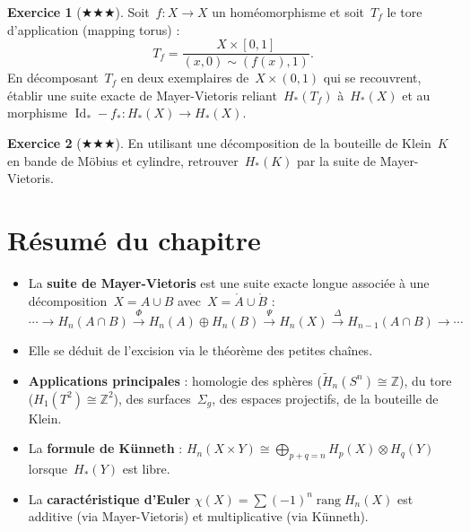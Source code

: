 \documentclass[12pt,a4paper,openany]{book}
\theoremstyle{definition}
\newtheorem{exercice}{Exercice}[chapter]
\theoremstyle{plain}
\theoremstyle{remark}
\newcommand{\Z}{\mathbb{Z}}
\DeclareMathOperator{\Id}{Id}
\begin{document}
\begin{exercice}[$\bigstar\bigstar\bigstar$]\label{exo:mv-mapping-torus}
Soit~$f \colon X \to X$ un homéomorphisme et soit~$T_f$ le tore d'application
(mapping torus) :
\[
  T_f = \frac{X \times [0,1]}{(x, 0) \sim (f(x), 1)}.
\]
En décomposant~$T_f$ en deux exemplaires de~$X \times (0,1)$ qui se recouvrent, établir
une suite exacte de Mayer-Vietoris reliant~$H_*(T_f)$ à~$H_*(X)$ et au morphisme
$\Id_* - f_* \colon H_*(X) \to H_*(X)$.
\end{exercice}

\begin{exercice}[$\bigstar\bigstar\bigstar$]\label{exo:mv-klein-mv}
En utilisant une décomposition de la bouteille de Klein~$K$ en bande de Möbius et
cylindre, retrouver~$H_*(K)$ par la suite de Mayer-Vietoris.
\end{exercice}

\section*{Résumé du chapitre}

\begin{itemize}
  \item La \textbf{suite de Mayer-Vietoris} est une suite exacte longue associée à une
    décomposition~$X = A \cup B$ avec~$X = \mathring{A} \cup \mathring{B}$ :
    \[
      \cdots \to H_n(A \cap B) \xrightarrow{\Phi} H_n(A) \oplus H_n(B) \xrightarrow{\Psi}
      H_n(X) \xrightarrow{\Delta} H_{n-1}(A \cap B) \to \cdots
    \]
  \item Elle se déduit de l'excision via le théorème des petites chaînes.
  \item \textbf{Applications principales} : homologie des sphères ($\widetilde{H}_n(S^n) \cong \Z$),
    du tore ($H_1(T^2) \cong \Z^2$), des surfaces~$\Sigma_g$, des espaces projectifs, de la
    bouteille de Klein.
  \item La \textbf{formule de Künneth} : $H_n(X \times Y) \cong \bigoplus_{p+q=n} H_p(X) \otimes H_q(Y)$
    lorsque~$H_*(Y)$ est libre.
  \item La \textbf{caractéristique d'Euler} $\chi(X) = \sum (-1)^n \operatorname{rang} H_n(X)$
    est additive (via Mayer-Vietoris) et multiplicative (via Künneth).
\end{itemize}
\end{document}

